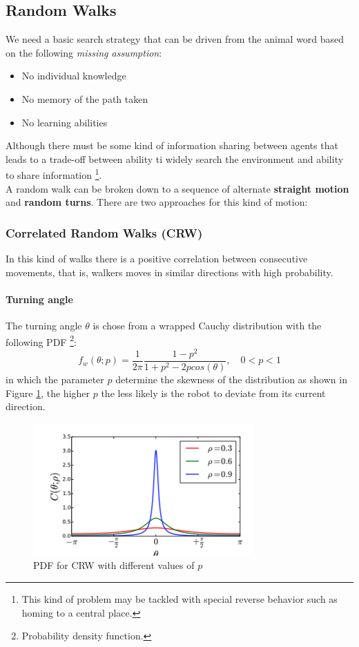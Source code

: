 \documentclass[10pt,a4paper]{article}
\begin{document}
\subsection{Random Walks}
We need a basic search strategy that can be driven from the animal word based on the following \textit{missing assumption}:
\begin{itemize}
\item No individual knowledge
\item No memory of the path taken
\item No learning abilities 
\end{itemize} 
Although there must be some kind of information sharing between agents that leads to a trade-off between ability ti widely search the environment and ability to share information \footnote{This kind of problem may be tackled with special reverse behavior such as homing to a central place.}.\\
A random walk can be broken down to a sequence of alternate \textbf{straight motion} and \textbf{random turns}. There are two approaches for this kind of motion:

\subsubsection{Correlated Random Walks (CRW)}
In this kind of walks there is a positive correlation between consecutive movements, that is, walkers moves in similar directions with high probability. 

\paragraph{Turning angle}
The turning angle $\theta$ is chose from a wrapped Cauchy distribution with the following PDF \footnote{Probability density function.}:
\[f_w(\theta; p)=\frac{1}{2 \pi}\frac{1-p^2}{1+p^2-2pcos(\theta)},\quad 0<p<1\]
in which the parameter $p$ determine the skewness of the distribution as shown in Figure \ref{fig:crw_pdf}, the higher $p$ the less likely is the robot to deviate from its current direction. 


\begin{figure}[t]
\centering
\includegraphics[scale=0.8]{images/random_walk.png}
\caption{PDF for CRW with different values of $p$}
\label{fig:crw_pdf}
\end{figure}
\end{document}
